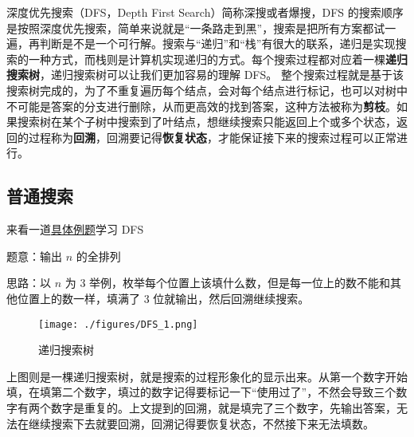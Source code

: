 
深度优先搜索（DFS，Depth First Search）简称深搜或者爆搜，DFS 的搜索顺序是按照深度优先搜索，简单来说就是“一条路走到黑”，搜索是把所有方案都试一遍，再判断是不是一个可行解。搜索与“递归”和“栈”有很大的联系，递归是实现搜索的一种方式，而栈则是计算机实现递归的方式。每个搜索过程都对应着一棵\textbf{递归搜索树}，递归搜索树可以让我们更加容易的理解 DFS。
整个搜索过程就是基于该搜索树完成的，为了不重复遍历每个结点，会对每个结点进行标记，也可以对树中不可能是答案的分支进行删除，从而更高效的找到答案，这种方法被称为\textbf{剪枝}。如果搜索树在某个子树中搜索到了叶结点，想继续搜索只能返回上个或多个状态，返回的过程称为\textbf{回溯}，回溯要记得\textbf{恢复状态}，才能保证接下来的搜索过程可以正常进行。


\subsection{普通搜索}
来看一道\href{https://www.luogu.com.cn/problem/P1706}{具体例题}学习 DFS

题意：输出 $n$ 的全排列

思路：以 $n$ 为 $3$ 举例，枚举每个位置上该填什么数，但是每一位上的数不能和其他位置上的数一样，填满了 $3$ 位就输出，然后回溯继续搜索。

\begin{figure}[ht]
\centering
\texttt{[image: ./figures/DFS\_1.png]}
\caption{递归搜索树} \label{DFS_fig1}
\end{figure}

上图则是一棵递归搜索树，就是搜索的过程形象化的显示出来。从第一个数字开始填，在填第二个数字，填过的数字记得要标记一下“使用过了”，不然会导致三个数字有两个数字是重复的。上文提到的回溯，就是填完了三个数字，先输出答案，无法在继续搜索下去就要回溯，回溯记得要恢复状态，不然接下来无法填数。

